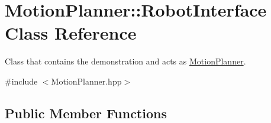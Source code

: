 \hypertarget{classMotionPlanner_1_1RobotInterface}{}\section{Motion\+Planner\+:\+:Robot\+Interface Class Reference}
\label{classMotionPlanner_1_1RobotInterface}


Class that contains the demonstration and acts as \hyperlink{namespaceMotionPlanner}{Motion\+Planner}.  




{\ttfamily \#include $<$Motion\+Planner.\+hpp$>$}

\subsection*{Public Member Functions}
